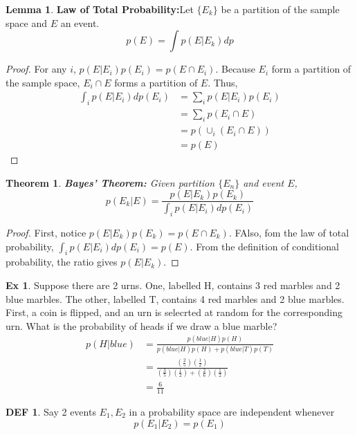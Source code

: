 \documentclass{article}
\newtheorem{theorem}{Theorem}
\theoremstyle{definition}\newtheorem{definition}{DEF}
\theoremstyle{definition}\newtheorem{example}{Ex}
\theoremstyle{lemma}\newtheorem{lemma}{Lemma}
\theoremstyle{corrolary}\newtheorem{corrolary}{Cor}
\begin{document}
\begin{lemma}
\textbf{Law of Total Probability:}\label{lawTotalProb}
Let $\{E_k\}$ be a partition of the sample space and $E$ an event.
\begin{equation*}
p(E)=\int p(E|E_k)dp
\end{equation*}
\end{lemma}
\begin{proof}
For any $i$, $p(E | E_i)p(E_i) = p(E \cap E_i)$.
Because $E_i$ form a partition of the sample space, $E_i \cap E$ forms a partition of $E$.
Thus,
\begin{align*}
\int_i p(E|E_i)dp(E_i) &= \sum_i p(E|E_i)p(E_i) \\
&= \sum_i p(E_i \cap E) \\
&= p(\cup_i (E_i \cap E)) \\
&= p(E)
\end{align*}
\end{proof}

\begin{theorem}
\textbf{Bayes' Theorem:}
Given partition $\{E_n \}$ and event $E$,
\begin{equation}
p(E_k | E) = \frac{p(E|E_k)p(E_k)}{\int_i p(E | E_i) dp(E_i)}
\end{equation}
\end{theorem}
\begin{proof}
First, notice $p(E|E_k)p(E_k)=p(E\cap E_k)$.
FAlso, fom the law of total probability, $\int_i p(E | E_i) dp(E_i)=p(E)$.
From the definition of conditional probability, the ratio gives $p(E | E_k)$.
\end{proof}

\begin{example}
Suppose there are 2 urns.
One, labelled H, contains 3 red marbles and 2 blue marbles.
The other, labelled T, contains 4 red marbles and 2 blue marbles.
First, a coin is flipped, and an urn is selecrted at random for the corresponding urn.
What is the probability of heads if we draw a blue marble?
\begin{align*}
p(H|blue) &= \frac{p(blue|H)p(H)}{p(blue|H)p(H) + p(blue|T)p(T)} \\
&= \frac{(\frac{2}{5})(\frac{1}{2})}{(\frac{3}{5}) (\frac{1}{2}) + (\frac{2}{6})(\frac{1}{2})} \\
&= \frac{6}{11}
\end{align*}
\end{example}

\begin{definition}
Say 2 events $E_1, E_2$ in a probability space are independent whenever
\begin{equation}
p(E_1 | E_2) = p(E_1)
\end{equation}
\end{definition}
\end{document}
